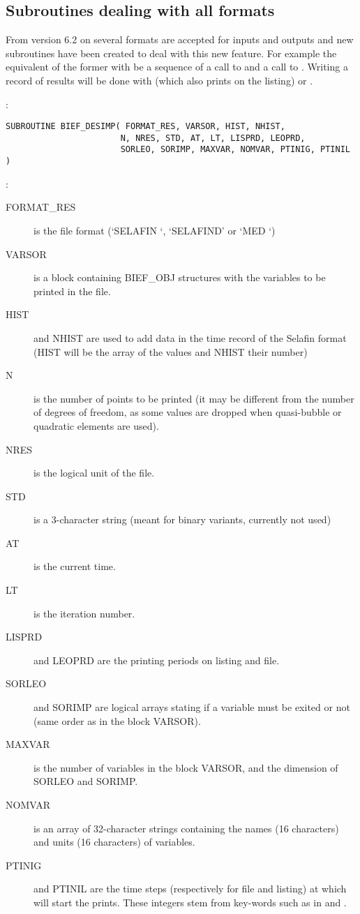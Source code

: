 \subsection{Subroutines dealing with all formats}

From version 6.2 on several formats are accepted for inputs and outputs and new
subroutines have been created to deal with this new feature. For example the
equivalent of the former  with be a sequence of a call to
 and a call to . Writing a record
of results will be done with  (which also prints on the
listing) or .

:
\begin{lstlisting}[language=TelFortran]
SUBROUTINE BIEF_DESIMP( FORMAT_RES, VARSOR, HIST, NHIST,
                       N, NRES, STD, AT, LT, LISPRD, LEOPRD,
                       SORLEO, SORIMP, MAXVAR, NOMVAR, PTINIG, PTINIL )
\end{lstlisting}

:
\begin{description}
  \item [FORMAT\_RES] is the file format (`SELAFIN `, `SELAFIND' or `MED     `)
  \item [VARSOR] is a block containing BIEF\_OBJ structures with the variables
    to be printed in the file.
  \item [HIST] and NHIST are used to add data in the time record of the Selafin
    format (HIST will be the array of the values and NHIST their number)
  \item [N] is the number of points to be printed (it may be different from the
    number of degrees of freedom, as some values are dropped when quasi-bubble
    or quadratic elements are used).
  \item [NRES] is the logical unit of the file.
  \item [STD] is a 3-character string (meant for binary variants, currently not
    used)
  \item [AT] is the current time.
  \item [LT] is the iteration number.
  \item [LISPRD] and LEOPRD are the printing periods on listing and file.
  \item [SORLEO] and SORIMP are logical arrays stating if a variable must be
    exited or not (same order as in the block VARSOR).
  \item [MAXVAR] is the number of variables in the block VARSOR, and the
    dimension of SORLEO and SORIMP.
  \item [NOMVAR] is an array of 32-character strings containing the names (16
    characters) and units (16 characters) of variables.
  \item [PTINIG] and PTINIL are the time steps (respectively for file and
    listing) at which will start the prints. These integers stem from key-words
    such as  in
     and .
\end{description}


